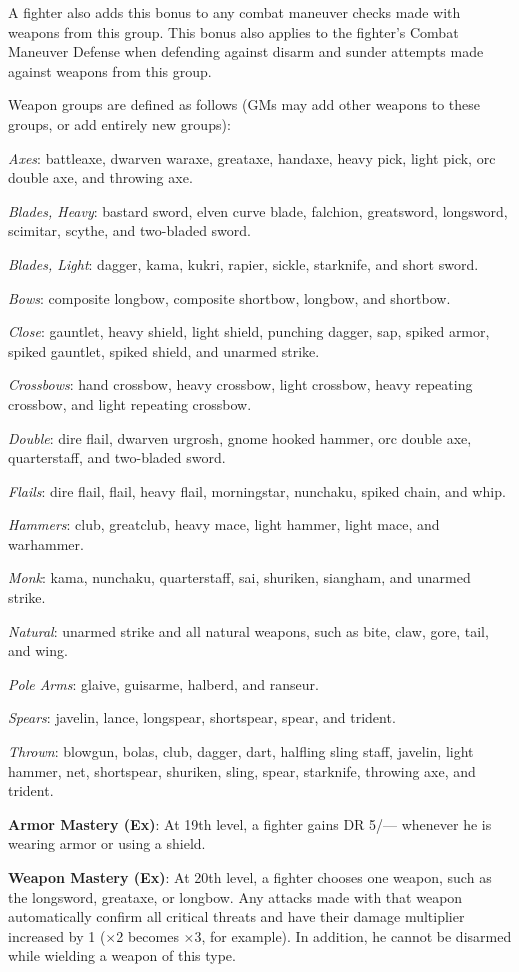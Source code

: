 A fighter also adds this bonus to any combat maneuver checks made with weapons from this group. This bonus also applies to the fighter's Combat Maneuver Defense when defending against disarm and sunder attempts made against weapons from this group.
				
Weapon groups are defined as follows (GMs may add other weapons to these groups, or add entirely new groups):
				
\textit{Axes}: battleaxe, dwarven waraxe, greataxe, handaxe, heavy pick, light pick, orc double axe, and throwing axe. 
				
\textit{Blades, Heavy}: bastard sword, elven curve blade, falchion, greatsword, longsword, scimitar, scythe, and two-bladed sword.
				
\textit{Blades, Light}: dagger, kama, kukri, rapier, sickle, starknife, and short sword.
				
\textit{Bows}: composite longbow, composite shortbow, longbow, and shortbow.
				
\textit{Close}: gauntlet, heavy shield, light shield, punching dagger, sap, spiked armor, spiked gauntlet, spiked shield, and unarmed strike.
				
\textit{Crossbows}: hand crossbow, heavy crossbow, light crossbow, heavy repeating crossbow, and light repeating crossbow.
				
\textit{Double}: dire flail, dwarven urgrosh, gnome hooked hammer, orc double axe, quarterstaff, and two-bladed sword.
				
\textit{Flails}: dire flail, flail, heavy flail, morningstar, nunchaku, spiked chain, and whip.
				
\textit{Hammers}: club, greatclub, heavy mace, light hammer, light mace, and warhammer.
				
\textit{Monk}: kama, nunchaku, quarterstaff, sai, shuriken, siangham, and unarmed strike.
				
\textit{Natural}: unarmed strike and all natural weapons, such as bite, claw, gore, tail, and wing.
				
\textit{Pole Arms}: glaive, guisarme, halberd, and ranseur.
				
\textit{Spears}: javelin, lance, longspear, shortspear, spear, and trident.
				
\textit{Thrown}: blowgun, bolas, club, dagger, dart, halfling sling staff, javelin, light hammer, net, shortspear, shuriken, sling, spear, starknife, throwing axe, and trident.
				
\textbf{Armor Mastery (Ex)}: At 19th level, a fighter gains DR 5/--- whenever he is wearing armor or using a shield.
				
\textbf{Weapon Mastery (Ex)}: At 20th level, a fighter chooses one weapon, such as the longsword, greataxe, or longbow. Any attacks made with that weapon automatically confirm all critical threats and have their damage multiplier increased by 1 (\mbox{$\times$}2 becomes \mbox{$\times$}3, for example). In addition, he cannot be disarmed while wielding a weapon of this type.
        	
